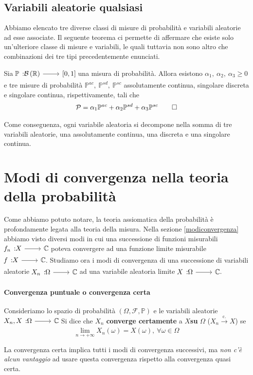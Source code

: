 \subsection{Variabili aleatorie qualsiasi}
Abbiamo elencato tre diverse classi di misure di probabilità e variabili aleatorie ad esse associate. Il seguente teorema ci permette di affermare che esiste solo un'ulteriore classe di misure e variabili, le quali tuttavia non sono altro che combinazioni dei tre tipi precedentemente enunciati.
\begin{theoremaqed}
	Sia $\funz{\mathbb{P}}{\mathcal{B}\left(\realset\right)}{\left[0,1\right]}$ una misura di probabilità. Allora esistono $\alpha_1,\ \alpha_2,\ \alpha_3\geq 0$ e tre misure di probabilità $\mathbb{P}^{ac},\ \mathbb{P}^{sd},\ \mathbb{P}^{sc}$ assolutamente continua, singolare discreta e singolare continua, rispettivamente, tali che
	\begin{equation}
		\mathcal{P}=\alpha_1\mathbb{P}^{ac}+\alpha_2\mathbb{P}^{sd}+\alpha_3\mathbb{P}^{sc}\qedhere
	\end{equation}
\end{theoremaqed}
Come conseguenza, ogni variabile aleatoria si decompone nella somma di tre variabili aleatorie, una assolutamente continua, una discreta e una singolare continua.
\section{Modi di convergenza nella teoria della probabilità}
Come abbiamo potuto notare, la teoria assiomatica della probabilità è profondamente legata alla teoria della misura. Nella sezione \ref{modiconvergenza} abbiamo visto diversi modi in cui una successione di funzioni misurabili $\funz{f_n}{X}{\complexset}$ poteva convergere ad una funzione limite misurabile $\funz{f}{X}{\complexset}$. Studiamo ora i modi di convergenza di una successione di variabili aleatorie $\funz{X_n}{\Omega}{\complexset}$ ad una variabile aleatoria limite $\funz{X}{\Omega}{\complexset}$.
\paragraph{Convergenza puntuale o convergenza certa}
\begin{define}
	Consideriamo lo spazio di probabilità $\left(\Omega,\mathcal{F},\mathbb{P}\right)$ e le variabili aleatorie $\funz{X_n,X}{\Omega}{\complexset}$
	Si dice che $X_n$ \textbf{converge certamente} a $X$\textbf{su} $\Omega$ ($X_n\overset{\text{c.}}{\to} X$) se
	\begin{equation}
		\lim_{n\to+\infty}X_n\left(\omega\right)=X\left(\omega\right),\ \forall \omega\in\Omega
	\end{equation}
\end{define}
La convergenza certa implica tutti i modi di convergenza successivi, ma \textit{non c'è alcun vantaggio} ad usare questa convergenza rispetto alla convergenza quasi certa.
